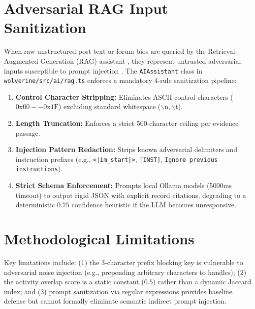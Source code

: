 \section{Adversarial RAG Input Sanitization}
\label{sec:rag_sanitization}

When raw unstructured post text or forum bios are queried by the Retrieval-Augmented Generation (RAG) assistant \cite{lewis2020retrieval, gao2024retrieval}, they represent untrusted adversarial inputs susceptible to prompt injection \cite{perez2022ignore, greshake2023not, liu2024formalizing}. The \texttt{AIAssistant} class in \texttt{wolverine/src/ai/rag.ts} enforces a mandatory 4-rule sanitization pipeline:

\begin{enumerate}
    \item \textbf{Control Character Stripping:} Eliminates ASCII control characters ($\text{0x00}--\text{0x1F}$) excluding standard whitespace ($\backslash\text{n}, \backslash\text{t}$).
    \item \textbf{Length Truncation:} Enforces a strict 500-character ceiling per evidence passage.
    \item \textbf{Injection Pattern Redaction:} Strips known adversarial delimiters and instruction prefixes (e.g., \texttt{<|im\_start|>}, \texttt{[INST]}, \texttt{Ignore previous instructions}).
    \item \textbf{Strict Schema Enforcement:} Prompts local Ollama models (5000ms timeout) to output rigid JSON with explicit record citations, degrading to a deterministic $0.75$ confidence heuristic if the LLM becomes unresponsive.
\end{enumerate}

\section{Methodological Limitations}
\label{sec:methodology_limitations}

Key limitations include: (1) the 3-character prefix blocking key is vulnerable to adversarial noise injection (e.g., prepending arbitrary characters to handles); (2) the activity overlap score is a static constant ($0.5$) rather than a dynamic Jaccard index; and (3) prompt sanitization via regular expressions provides baseline defense but cannot formally eliminate semantic indirect prompt injection.
